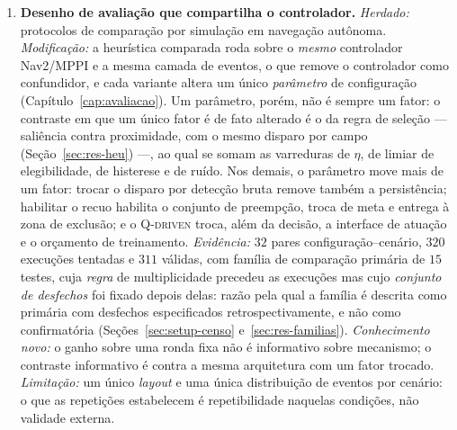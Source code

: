 \begin{enumerate}
    \item \textbf{Desenho de avaliação que compartilha o controlador.} \emph{Herdado:}
    protocolos de comparação por simulação em navegação autônoma. \emph{Modificação:} a
    heurística comparada roda sobre o \emph{mesmo} controlador Nav2/MPPI e a mesma
    camada de eventos, o que remove o controlador como confundidor, e cada variante
    altera um único \emph{parâmetro} de configuração (Capítulo~\ref{cap:avaliacao}).
    Um parâmetro, porém, não é sempre um fator: o contraste em que um único fator é de
    fato alterado é o da regra de seleção --- saliência contra proximidade, com o mesmo
    disparo por campo (Seção~\ref{sec:res-heu}) ---, ao qual se somam as varreduras de
    $\eta$, de limiar de elegibilidade, de histerese e de ruído. Nos demais, o
    parâmetro move mais de um fator: trocar o disparo por detecção bruta remove também
    a persistência; habilitar o recuo habilita o conjunto de preempção, troca de meta e
    entrega à zona de exclusão; e o \textsc{Q-driven} troca, além da decisão, a
    interface de atuação e o orçamento de treinamento. \emph{Evidência:} $32$ pares
    configuração--cenário, $320$ execuções tentadas e $311$ válidas, com família de
    comparação primária de $15$ testes, cuja \emph{regra} de multiplicidade precedeu as
    execuções mas cujo \emph{conjunto de desfechos} foi fixado depois delas: razão
    pela qual a família é descrita como primária com desfechos especificados
    retrospectivamente, e não como confirmatória
    (Seções~\ref{sec:setup-censo} e~\ref{sec:res-familias}).
    \emph{Conhecimento novo:} o ganho sobre uma ronda fixa não é informativo sobre
    mecanismo; o contraste informativo é contra a mesma arquitetura com um fator
    trocado. \emph{Limitação:} um único \textit{layout} e uma única distribuição de
    eventos por cenário: o que as repetições estabelecem é repetibilidade naquelas
    condições, não validade externa.


\end{enumerate}

